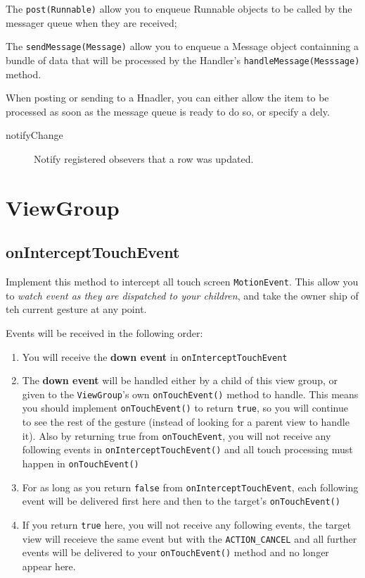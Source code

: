 \documentclass[11pt, a4paper]{book}
\begin{document}
The \verb|post(Runnable)| allow you to enqueue Runnable objects to be called by
the messager queue when they are received;

The \verb|sendMessage(Message)| allow you to enqueue a Message object
containning a bundle of data that will be processed by the Handler's
\verb|handleMessage(Messsage)| method.

When posting or sending to a Hnadler, you can either allow the item to be
processed as soon as the message queue is ready to do so, or specify a dely. 
\begin{description}
\item[notifyChange] Notify registered obsevers that a row was updated. 
\end{description}
\section{ViewGroup}
\subsection{onInterceptTouchEvent}
Implement this method to intercept all touch screen \verb|MotionEvent|. This
allow you to \emph{watch event as they are dispatched to your children}, and
take the owner ship of teh current gesture at any point.

Events will be received in the following order:
\begin{enumerate}
\item You will receive the \textbf{down event} in \verb|onInterceptTouchEvent|
\item The \textbf{down event} will be handled either by a child of this view
group, or given to the \verb|ViewGroup|'s own \verb|onTouchEvent()| method to
handle. This means you should implement \verb|onTouchEvent()| to return
\verb|true|, so you will continue to see the rest of the gesture (instead of
looking for a parent view to handle it). Also by returning true from
\verb|onTouchEvent|, you will not receive any following events in
\verb|onInterceptTouchEvent()| and all touch processing must happen in
\verb|onTouchEvent()|
\item For as long as you return \verb|false| from \verb|onInterceptTouchEvent|,
each following event will be delivered first here and then to the target's
\verb|onTouchEvent()|
\item If you return \verb|true| here, you will not receive any following events,
the target view will receieve the same event but with the \verb|ACTION_CANCEL|
and all further events will be delivered to your \verb|onTouchEvent()| method
and no longer appear here.
\end{enumerate}
\end{document}
